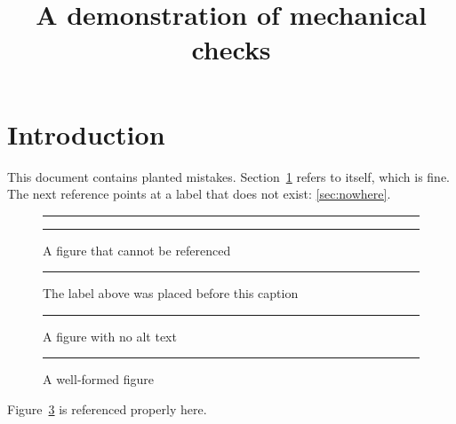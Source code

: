 \documentclass{article}
\providecommand{\Description}[2][]{}
\begin{document}
\title{A demonstration of mechanical checks}
\maketitle

\section{Introduction}
\label{sec:intro}
This document contains planted mistakes. Section~\ref{sec:intro} refers to
itself, which is fine. The next reference points at a label that does not
exist: \ref{sec:nowhere}.

\begin{figure}
  \centering
  \rule{3cm}{2cm}
\end{figure}

\begin{figure}
  \centering
  \rule{3cm}{2cm}
  \caption{A figure that cannot be referenced}
\end{figure}

\begin{figure}
  \centering
  \rule{3cm}{2cm}
  \label{fig:wrongnumber}
  \caption{The label above was placed before this caption}
\end{figure}

\begin{figure}
  \centering
  \rule{3cm}{2cm}
  \caption{A figure with no alt text}
  \label{fig:nodescription}
\end{figure}

\begin{figure}
  \centering
  \rule{3cm}{2cm}
  \caption{A well-formed figure}
  \Description{A grey rectangle standing in for a plot, used to show what a
  complete float looks like: caption first, then label, then a description.}
  \label{fig:good}
\end{figure}

Figure~\ref{fig:good} is referenced properly here.
\end{document}
